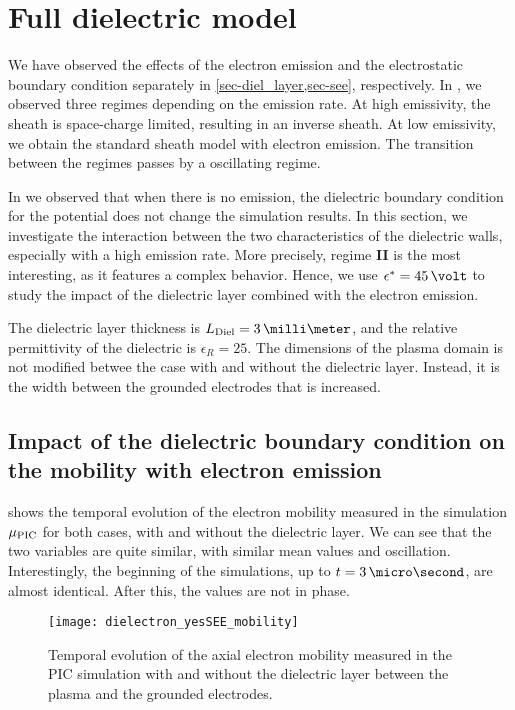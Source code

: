 
\section{Full dielectric model }
  \label{sec-fulldiel}
  
  We have observed the effects of the electron emission and the electrostatic boundary condition separately in \cref{sec-diel_layer,sec-see}, respectively.  
  In , we observed three regimes depending on the emission rate.
  At high emissivity, the sheath is space-charge limited, resulting in an inverse sheath.
  At low emissivity, we obtain the standard sheath model with electron emission.
  The transition between the regimes passes by a oscillating regime.
  
  In  we observed that when there is no emission, the dielectric boundary condition for the potential does not change the simulation results.
  In this section, we investigate the interaction between the two characteristics of the dielectric walls, especially with a high emission rate.
  More precisely, regime {\bf II} is the most interesting, as it features a complex behavior.
  Hence, we use $\crover=45\,\volt$ to study the impact of the dielectric layer combined with the electron emission.
  
  The dielectric layer thickness is $L_{\rm Diel} = 3\,\milli\meter$, and the relative permittivity of the dielectric is $\epsilon_R=25$.
  The dimensions of the plasma domain is not modified betwee the case with and without the dielectric layer.
  Instead, it is the width between the grounded electrodes that is increased.
  
  \subsection{Impact of the dielectric boundary condition on the mobility with electron emission}
    
     shows the temporal evolution of the electron mobility measured in the simulation $\mu_{\mathrm{PIC}}$ for both cases, with and without the dielectric layer.
    We can see that the two variables are quite similar, with similar mean values and oscillation.
    Interestingly, the beginning of the simulations, up to $t=3\,\micro\second$, are almost identical.
    After this, the values are not in phase.
    
    \begin{figure}[hbt]
      \centering
      \texttt{[image: dielectron\_yesSEE\_mobility]}
      \caption{Temporal evolution of the axial electron mobility measured in the \acs{PIC} simulation with and without the dielectric layer between the plasma and the grounded electrodes. }
      \label{fig-temporal_mu} 
    \end{figure}
    
